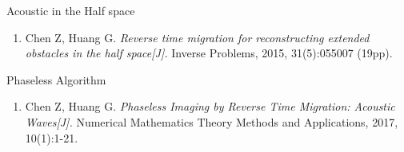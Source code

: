 \documentclass[cjk,8pt]{beamer}
\begin{document}
\begin{CJK*}{GBK}{kai}
\begin{frame}
\begin{small}
\begin{block}{Acoustic in the Half space}
\begin{enumerate}
  \item Chen Z, Huang G. {\it Reverse time migration for reconstructing extended obstacles in the half space[J].} Inverse Problems, 2015, 31(5):055007 (19pp).
\end{enumerate}
\end{block}

\begin{block}{Phaseless Algorithm}
\begin{enumerate}
  \item Chen Z, Huang G. {\it Phaseless Imaging by Reverse Time Migration: Acoustic Waves[J]. } Numerical Mathematics Theory Methods and Applications, 2017, 10(1):1-21.
\end{enumerate}
\end{block}
\end{small}

\end{frame}


\end{CJK*}
\end{document}
